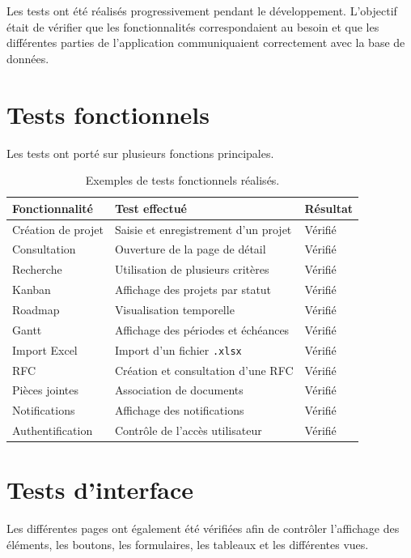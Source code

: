 \documentclass[12pt,a4paper,oneside]{report}
\begin{document}
Les tests ont été réalisés progressivement pendant le développement. L'objectif était de vérifier que les fonctionnalités correspondaient au besoin et que les différentes parties de l'application communiquaient correctement avec la base de données.

\section{Tests fonctionnels}

Les tests ont porté sur plusieurs fonctions principales.

\begin{table}[H]
\centering
\begin{tabularx}{\textwidth}{p{4cm}X p{3cm}}
\toprule
\textbf{Fonctionnalité} & \textbf{Test effectué} & \textbf{Résultat}\\
\midrule
Création de projet & Saisie et enregistrement d'un projet & Vérifié\\
Consultation & Ouverture de la page de détail & Vérifié\\
Recherche & Utilisation de plusieurs critères & Vérifié\\
Kanban & Affichage des projets par statut & Vérifié\\
Roadmap & Visualisation temporelle & Vérifié\\
Gantt & Affichage des périodes et échéances & Vérifié\\
Import Excel & Import d'un fichier \texttt{.xlsx} & Vérifié\\
RFC & Création et consultation d'une RFC & Vérifié\\
Pièces jointes & Association de documents & Vérifié\\
Notifications & Affichage des notifications & Vérifié\\
Authentification & Contrôle de l'accès utilisateur & Vérifié\\
\bottomrule
\end{tabularx}
\caption{Exemples de tests fonctionnels réalisés.}
\end{table}

\section{Tests d'interface}

Les différentes pages ont également été vérifiées afin de contrôler l'affichage des éléments, les boutons, les formulaires, les tableaux et les différentes vues.
\end{document}
